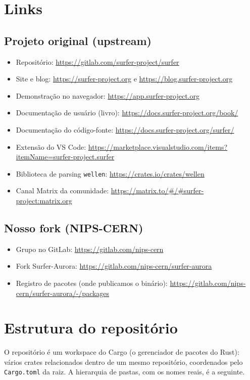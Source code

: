 \documentclass[11pt,a4paper]{article}
\begin{document}
\section{Links}

\subsection{Projeto original (upstream)}
\begin{itemize}
  \item Repositório: \url{https://gitlab.com/surfer-project/surfer}
  \item Site e blog: \url{https://surfer-project.org} e
        \url{https://blog.surfer-project.org}
  \item Demonstração no navegador: \url{https://app.surfer-project.org}
  \item Documentação de usuário (livro):
        \url{https://docs.surfer-project.org/book/}
  \item Documentação do código-fonte:
        \url{https://docs.surfer-project.org/surfer/}
  \item Extensão do VS Code:
        \url{https://marketplace.visualstudio.com/items?itemName=surfer-project.surfer}
  \item Biblioteca de parsing \texttt{wellen}:
        \url{https://crates.io/crates/wellen}
  \item Canal Matrix da comunidade:
        \url{https://matrix.to/#/#surfer-project:matrix.org}
\end{itemize}

\subsection{Nosso fork (NIPS-CERN)}
\begin{itemize}
  \item Grupo no GitLab: \url{https://gitlab.com/nips-cern}
  \item Fork Surfer-Aurora: \url{https://gitlab.com/nips-cern/surfer-aurora}
  \item Registro de pacotes (onde publicamos o binário):
        \url{https://gitlab.com/nips-cern/surfer-aurora/-/packages}
\end{itemize}

\section{Estrutura do repositório}

O repositório é um workspace do Cargo (o gerenciador de pacotes do Rust): vários
crates relacionados dentro de um mesmo repositório, coordenados pelo
\texttt{Cargo.toml} da raiz. A hierarquia de pastas, com os nomes reais, é a
seguinte.
\end{document}
